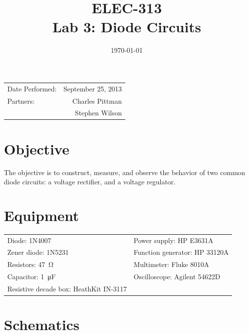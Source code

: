 \documentclass{article}
\author{}
\title{ELEC-313 \\ Lab 3: Diode Circuits\\ }
\date{\today}
\begin{document}
\maketitle

\begin{center}
  \begin{tabular}{lr}
    Date Performed: & September 25, 2013 \\
    Partners: & Charles Pittman \\
    & Stephen Wilson \\
  \end{tabular}
\end{center}

\newpage

\tableofcontents
\listoffigures
\listoftables

\newpage

\renewcommand{\labelenumi}{\alph{enumi}.}

\section{Objective}
\label{sec:objective}

The objective is to construct, measure, and observe the behavior of two common diode circuits: a voltage rectifier, and a voltage regulator.

\section{Equipment}
\label{sec:equipment}

\begin{tabular}{ll}
  \centering
  Diode: 1N4007 & Power supply: HP E3631A \\
  Zener diode: 1N5231 & Function generator: HP 33120A \\
  Resistors: \SI{47}{\ohm} & Multimeter: Fluke 8010A \\
  Capacitor: \SI{1}{\micro\farad} & Oscilloscope: Agilent 54622D \\
  Resistive decade box: HeathKit IN-3117 \\
\end{tabular}

\section{Schematics}
\label{sec:schematics}
\end{document}

